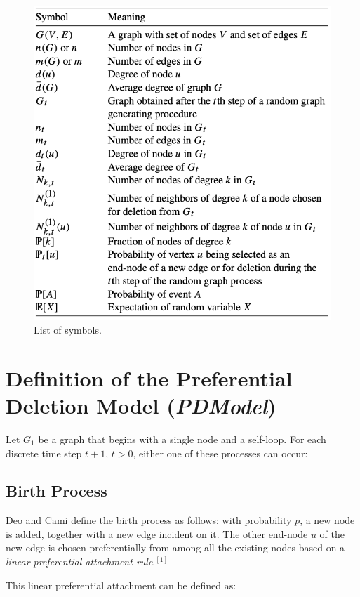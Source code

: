 \documentclass[final,3p,times,twocolumn]{elsarticle}
\begin{document}
\begin{figure}[h]
\centering
\includegraphics[width=1\linewidth]{notation.png}
\caption{List of symbols.}
\end{figure}

\section{Definition of the Preferential Deletion Model (\textit{PDModel})}
\label{S:3}

Let $G_1$ be a graph that begins with a single node and a self-loop. For each discrete time step $t + 1$, $t > 0$, either one of these processes can occur:

\subsection{Birth Process}

Deo and Cami define the birth process as follows: with probability $p$, a new node is added, together with a new edge incident on it. The other end-node $u$ of the new edge is chosen preferentially from among all the existing nodes based on a \textit{linear preferential attachment rule}.$^{[1]}$

This linear preferential attachment can be defined as:
\end{document}
